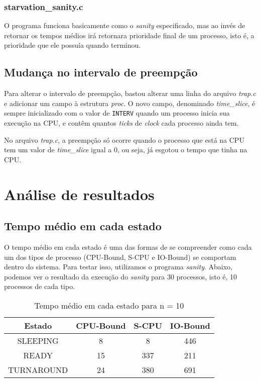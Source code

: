 \documentclass{article}
\begin{document}
\subsubsection{starvation\_sanity.c}

O programa funciona basicamente como o \textit{sanity} especificado, mas ao
invés de retornar os tempos médios irá retornara prioridade final de um
processo, isto é, a prioridade que ele possuía quando terminou.

\subsection{Mudança no intervalo de preempção}

Para alterar o intervalo de preempção, bastou alterar uma linha do arquivo
\textit{trap.c} e adicionar um campo à estrutura \textit{proc}. O novo campo,
denominado \textit{time\_slice}, é sempre inicializado com o valor de
\texttt{INTERV} quando um processo inicia sua execução na CPU, e contêm quantos
\textit{ticks} de \textit{clock} cada processo ainda tem.

No arquivo \textit{trap.c}, a preempção só ocorre quando o processo que está na
CPU tem um valor de \textit{time\_slice} igual a 0, ou seja, já esgotou o tempo
que tinha na CPU.

\section{Análise de resultados}

\subsection{Tempo médio em cada estado}

O tempo médio em cada estado é uma das formas de se compreender como cada um
dos tipos de processo (CPU-Bound, S-CPU e IO-Bound) se comportam dentro do
sistema. Para testar isso, utilizamos o programa \textit{sanity}. Abaixo,
podemos ver o resultado da execução do \textit{sanity} para 30 processos, isto
é, 10 processos de cada tipo.

\begin{table}[H]
      \centering
      \begin{tabular}{|c|c|c|c|}
            \hline
            Estado     & CPU-Bound & S-CPU & IO-Bound
            \\
            \hline
            SLEEPING   & 8         & 8     & 446      \\
            READY      & 15        & 337   & 211      \\
            TURNAROUND & 24        & 380   & 691      \\
            \hline
      \end{tabular}
      \caption{Tempo médio em cada estado para n = 10}
\end{table}
\end{document}
